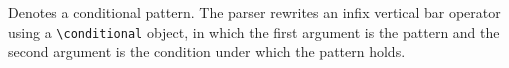 
Denotes a conditional pattern. The parser rewrites an infix vertical bar operator
using a \verb|\conditional| object, in which the first argument is the
pattern and the second argument is the condition under which the
pattern holds.

